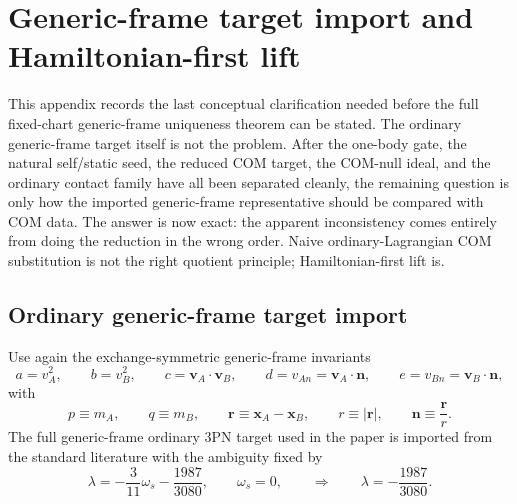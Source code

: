 \documentclass[11pt]{article}
\begin{document}

\section{Generic-frame target import and Hamiltonian-first lift}
\label{app:hamiltonian-first}

This appendix records the last conceptual clarification needed before the full
fixed-chart generic-frame uniqueness theorem can be stated.  The ordinary
generic-frame target itself is not the problem.  After the one-body gate, the
natural self/static seed, the reduced COM target, the COM-null ideal, and the
ordinary contact family have all been separated cleanly, the remaining question
is only how the imported generic-frame representative should be compared with
COM data.  The answer is now exact: the apparent inconsistency comes entirely
from doing the reduction in the wrong order.  Naive ordinary-Lagrangian COM
substitution is not the right quotient principle; Hamiltonian-first lift is.

\subsection{Ordinary generic-frame target import}
\label{app:hamiltonian-first-import}

Use again the exchange-symmetric generic-frame invariants
\begin{equation}
 a=v_A^2,
 \qquad
 b=v_B^2,
 \qquad
 c=\mathbf v_A\!\cdot\!\mathbf v_B,
 \qquad
 d=v_{An}=\mathbf v_A\!\cdot\!\mathbf n,
 \qquad
 e=v_{Bn}=\mathbf v_B\!\cdot\!\mathbf n,
\label{eq:app-hamiltonian-first-abcde}
\end{equation}
with
\begin{equation}
 p\equiv m_A,
 \qquad
 q\equiv m_B,
 \qquad
 \mathbf r\equiv \mathbf x_A-\mathbf x_B,
 \qquad
 r\equiv |\mathbf r|,
 \qquad
 \mathbf n\equiv \frac{\mathbf r}{r}.
\label{eq:app-hamiltonian-first-pqrn}
\end{equation}
The full generic-frame ordinary $3$PN target used in the paper is imported from
 the standard literature with the ambiguity fixed by
\begin{equation}
\lambda=-\frac{3}{11}\omega_s-\frac{1987}{3080},
\qquad
\omega_s=0,
\qquad
\Longrightarrow
\qquad
\lambda=-\frac{1987}{3080}.
\label{eq:app-hamiltonian-first-lambda}
\end{equation}
\end{document}
